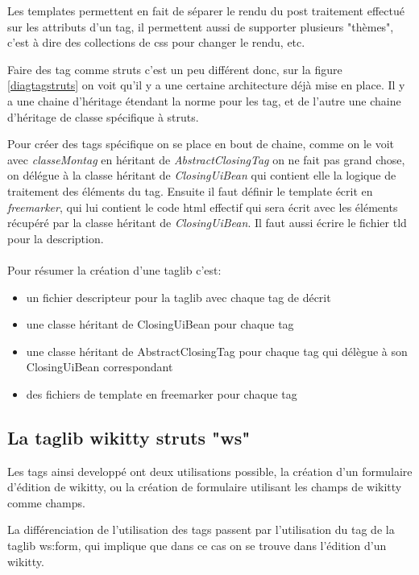 Les templates permettent en fait de séparer le rendu du post traitement effectué
sur les attributs d'un tag, il permettent aussi de supporter plusieurs "thèmes", 
c'est à dire des collections de css pour changer le rendu, etc.

Faire des tag comme struts c'est un peu différent donc, sur la figure \ref{diagtagstruts} 
on voit qu'il y a une certaine architecture déjà mise en place. Il y a une chaine 
d'héritage étendant la norme pour les tag, et de l'autre une chaine d'héritage 
de classe spécifique à struts. 

Pour créer des tags spécifique on se place en bout de chaine, comme on le voit 
avec \emph{classeMontag} en héritant de \emph{AbstractClosingTag} on ne fait pas
grand chose, on délégue à la classe héritant de \emph{ClosingUiBean} qui contient 
elle la logique de traitement des éléments du tag. Ensuite il faut définir le
template écrit en \emph{freemarker}, qui lui contient le code html effectif 
qui sera écrit avec les éléments récupéré par la classe héritant de \emph{ClosingUiBean}.
Il faut aussi écrire le fichier tld pour la description.\\
\\
Pour résumer la création d'une taglib c'est:

\begin{itemize}
\item un fichier descripteur pour la taglib avec chaque tag de décrit 
\item une classe héritant de ClosingUiBean pour chaque tag
\item une classe héritant de AbstractClosingTag pour chaque tag qui délègue à son ClosingUiBean correspondant
\item des fichiers de template en freemarker pour chaque tag
\end{itemize}



\subsection{La taglib wikitty struts "ws"}

Les tags ainsi developpé ont deux utilisations possible, la création d'un 
formulaire d'édition de wikitty, ou la création de formulaire utilisant les 
champs de wikitty comme champs. 

La différenciation de l'utilisation des tags passent par l'utilisation du tag 
de la taglib ws:form, qui implique que dans ce cas on se trouve dans l'édition d'un
wikitty.


